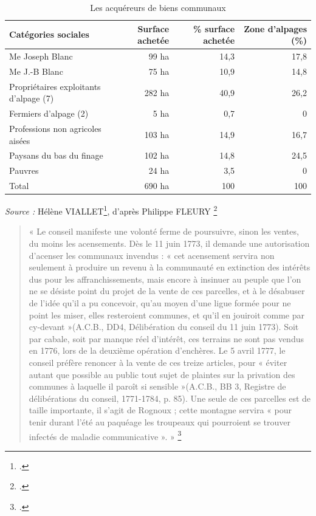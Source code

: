 \documentclass[12pt,a4paper]{report}
\begin{document}
\begin{table}[htbp]
	\centering
	\caption{Les acquéreurs de biens communaux}
	\label{tab:acquereurs_communaux}
	\begin{tabular}{lrrr}
		\toprule
		Catégories sociales & Surface achetée & \% surface achetée & Zone d’alpages (\%) \\
		\midrule
		Me Joseph Blanc & 99 ha & 14,3 & 17,8 \\
		Me J.-B Blanc & 75 ha & 10,9 & 14,8 \\
		Propriétaires exploitants d’alpage (7) & 282 ha & 40,9 & 26,2 \\
		Fermiers d’alpage (2) & 5 ha & 0,7 & 0 \\
		Professions non agricoles aisées & 103 ha & 14,9 & 16,7 \\
		Paysans du bas du finage & 102 ha & 14,8 & 24,5 \\
		Pauvres & 24 ha & 3,5 & 0 \\
		\midrule
		Total & 690 ha & 100 & 100 \\
		\bottomrule
	\end{tabular}
	
	\footnotesize
\end{table}
\emph{Source :} Hélène VIALLET\footcite[80]{HViallet1993}, d’après Philippe FLEURY \footcite[40]{Fleury1985CommunalBeaufort}


\begin{quote}
	« Le conseil manifeste une volonté ferme de poursuivre, sinon les ventes, du moins les acensements. Dès le 11 juin 1773, il demande une autorisation d'acenser les communaux invendus : « cet acensement servira non seulement à produire un revenu à la communauté en extinction des intérêts dus pour les affranchissements, mais encore à insinuer au peuple que l'on ne se désiste point du projet de la vente de ces parcelles, et à le désabuser de l'idée qu'il a pu concevoir, qu'au moyen d'une ligue formée pour ne point les miser, elles resteroient communes, et qu'il en jouiroit comme par cy-devant »(A.C.B., DD4, Délibération du conseil du 11 juin 1773). Soit par cabale, soit par manque réel d'intérêt, ces terrains ne sont pas vendus en 1776, lors de la deuxième opération d'enchères. Le 5 avril 1777, le conseil préfère renoncer à la vente de ces treize articles, pour « éviter autant que possible au public tout sujet de plaintes sur la privation des communes à laquelle il paroît si sensible »(A.C.B., BB 3, Registre de délibérations du conseil, 1771-1784, p. 85). Une seule de ces parcelles est de taille importante, il s'agit de Rognoux ; cette montagne servira « pour tenir durant l'été au paquéage les troupeaux qui pourroient se trouver infectés de maladie communicative ». »
	\footcite[81]{HViallet1993}
\end{quote}
\end{document}
